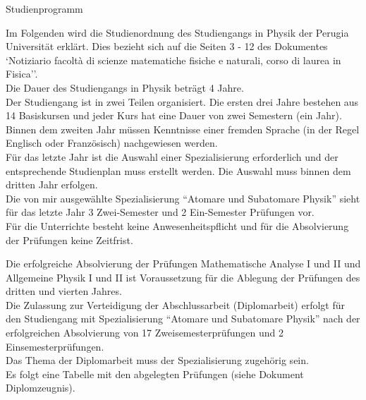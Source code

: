 \documentclass[a4paper,11pt]{article}
\begin{document}
\pagestyle{empty}
\begin{center}
  \huge{Studienprogramm}
\end{center}
\vspace{1cm}

Im Folgenden wird die Studienordnung des Studiengangs in Physik der
Perugia Universit\"at erkl\"art. Dies bezieht sich auf die Seiten 3 - 12 des
Dokumentes `Notiziario facolt\`a di scienze matematiche fisiche e naturali,
corso di laurea in Fisica''.\\

Die Dauer des Studiengangs in Physik betr\"agt 4 Jahre.\\

Der Studiengang ist in zwei Teilen organisiert. Die ersten drei Jahre bestehen
aus 14 Basiskursen und jeder Kurs hat eine Dauer von zwei Semestern (ein
Jahr).\\

Binnen dem zweiten Jahr m\"ussen Kenntnisse einer fremden Sprache (in der Regel
Englisch oder Franz\"osisch) nachgewiesen werden.\\

F\"ur das letzte Jahr ist die Auswahl einer Spezialisierung erforderlich und der
entsprechende Studienplan muss erstellt werden. Die Auswahl muss binnen dem
dritten Jahr erfolgen.\\

Die von mir ausgew\"ahlte Spezialisierung ``Atomare und Subatomare Physik''
sieht f\"ur das letzte Jahr 3 Zwei-Semester und 2 Ein-Semester Pr\"ufungen vor.
\\

F\"ur die Unterrichte besteht keine Anwesenheitspflicht und f\"ur die
Absolvierung der Pr\"ufungen keine Zeitfrist.

Die erfolgreiche Absolvierung der Pr\"ufungen Mathematische Analyse I und II und
Allgemeine Physik I und II ist Voraussetzung f\"ur die Ablegung der Pr\"ufungen
des dritten und vierten Jahres.\\

Die Zulassung zur Verteidigung der Abschlussarbeit (Diplomarbeit) erfolgt f\"ur
den Studiengang mit Spezialisierung ``Atomare und Subatomare Physik'' nach der
erfolgreichen Absolvierung von 17 Zweisemesterpr\"ufungen und 2
Einsemesterpr\"ufungen.\\

Das Thema der Diplomarbeit muss der Spezialisierung zugeh\"orig sein.\\

Es folgt eine Tabelle mit den abgelegten Pr\"ufungen (siehe Dokument
Diplomzeugnis).
\end{document}
